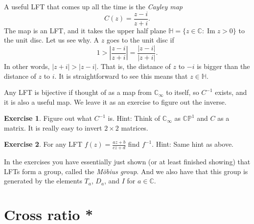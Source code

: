 \documentclass[12pt,openany]{book}
\renewcommand{\Im}{\operatorname{Im}}
\newcommand{\sabs}[1]{\lvert {#1} \rvert}
\newcommand{\abs}[1]{\left\lvert {#1} \right\rvert}
\newcommand{\C}{{\mathbb{C}}}
\newcommand{\bH}{{\mathbb{H}}}
\newcommand{\bP}{{\mathbb{P}}}
\newcommand{\myindex}[1]{#1\index{#1}}
\theoremstyle{plain}
\theoremstyle{remark}
\theoremstyle{definition}
\newenvironment{exbox}{%
    \def\FrameCommand{\vrule width 1pt \relax\hspace {10pt}}%
    \MakeFramed {\advance \hsize -\width \FrameRestore }%
}{%
    \endMakeFramed
}
\theoremstyle{exercise}
\newtheorem{exercise}{Exercise}[section]
\theoremstyle{example}
\begin{document}
\medskip

A useful LFT that comes up all the time is the
\emph{\myindex{Cayley map}}
\begin{equation*}
C(z)
=
\frac{z - i}{z + i} .
\end{equation*}
The map is an LFT, and it
takes the upper half plane $\bH = \{ z \in \C : \Im z > 0 \}$ to the
unit disc.  Let us see why.  A $z$ goes to the unit disc if
\begin{equation*}
1 > \abs{\frac{z - i}{z + i} }
=
\frac{\sabs{z - i}}{\sabs{z + i}} .
\end{equation*}
In other words, $\sabs{z+i} > \sabs{z - i}$.  That is, the distance of $z$
to $-i$ is bigger than the distance of $z$ to $i$.  It is straightforward
to see this means that $z \in \bH$.

Any LFT is bijective if thought of as a map from $\C_\infty$
to itself, so $C^{-1}$ exists, and it is also a useful map.  We leave
it as an exercise to figure out the inverse.

\begin{exbox}
\begin{exercise}
Figure out what $C^{-1}$ is.  Hint: Think of $\C_\infty$ as $\C \bP^1$
and $C$ as a matrix.  It is really easy to invert $2 \times 2$ matrices.
\end{exercise}

\begin{exercise}
For any LFT $f(z) = \frac{az+b}{cz+d}$ find $f^{-1}$.
Hint: Same hint as above.
\end{exercise}
\end{exbox}

In the exercises you have essentially just shown (or at least finished
showing) that LFTs form a group, called the \emph{\myindex{M\"obius group}}.
And we also have that this group is generated by the elements
$T_a$, $D_a$, and $I$ for $a\in \C$.


\section{Cross ratio *}

\end{document}
